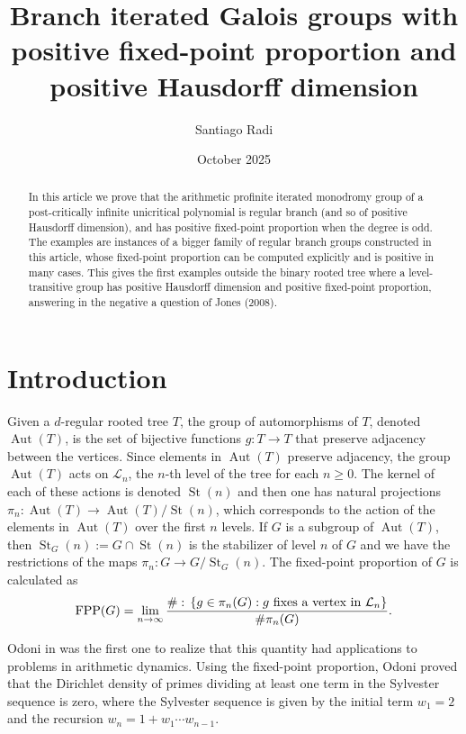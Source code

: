 \documentclass{amsart}
\title[Branch iterated Galois groups with positive fixed-point proportion and positive Hausdorff dimension]{Branch iterated Galois groups with positive fixed-point proportion and positive Hausdorff dimension}
\author{Santiago Radi}
\date{October 2025}
\def\set#1{{\def\st{\;:\;}\left\{#1\right\}}}
\DeclareMathOperator{\Aut}{Aut}
\DeclareMathOperator{\FPP}{FPP}
\DeclareMathOperator{\St}{St}
\DeclareMathOperator{\st}{st}
\begin{document}
\begin{abstract}
In this article we prove that the arithmetic profinite iterated monodromy group of a post-critically infinite unicritical polynomial is regular branch (and so of positive Hausdorff dimension), and has positive fixed-point proportion when the degree is odd. The examples are instances of a bigger family of regular branch groups constructed in this article, whose fixed-point proportion can be computed explicitly and is positive in many cases. 
This gives the first examples outside the binary rooted tree where a level-transitive group has positive Hausdorff dimension and positive fixed-point proportion, answering in the negative a question of Jones (2008).
\end{abstract}

\maketitle

\section{Introduction}
\label{section: Introduction}

Given a $d$-regular rooted tree $T$, the group of automorphisms of $T$, denoted $\Aut(T)$, is the set of bijective functions $g: T \rightarrow T$ that preserve adjacency between the vertices. Since elements in $\Aut(T)$ preserve adjacency, the group $\Aut(T)$ acts on $\mathcal{L}_n$, the $n$-th level of the tree for each $n \geq 0$. The kernel of each of these actions is denoted $\St(n)$ and then one has natural projections $\pi_n: \Aut(T) \rightarrow \Aut(T)/\St(n)$, which corresponds to the action of the elements in $\Aut(T)$ over the first $n$ levels. If $G$ is a subgroup of $\Aut(T)$, then $\St_G(n) := G \cap \St(n)$ is the stabilizer of level $n$ of $G$ and we have the restrictions of the maps $\pi_n: G \rightarrow G/\St_G(n)$. The fixed-point proportion of $G$ is calculated as $$\FPP(G) = \lim_{n \rightarrow \infty} \frac{\# \set{g \in \pi_n(G): \text{$g$ fixes a vertex in $\mathcal{L}_n$}}}{\# \pi_n(G)}.$$

Odoni in \cite{Odoni1985} was the first one to realize that this quantity had applications to problems in arithmetic dynamics. Using the fixed-point proportion, Odoni proved that the Dirichlet density of primes dividing at least one term in the Sylvester sequence is zero, where the Sylvester sequence is given by the initial term $w_1 =2$ and the recursion $w_n = 1+w_1\cdots w_{n-1}$.
\end{document}
